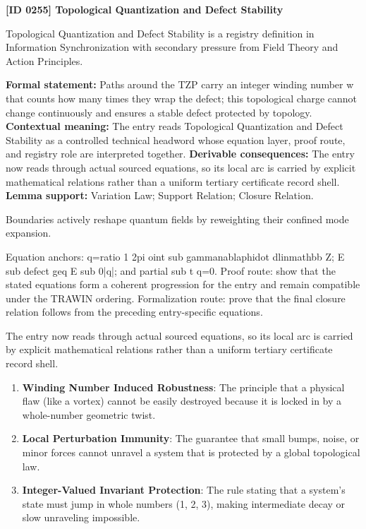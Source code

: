 \clearpage
\noindent\textbf{[ID 0255] Topological Quantization and Defect Stability}\par
\vspace{0.35em}
\begingroup\small
{}
Topological Quantization and Defect Stability is a registry definition in Information Synchronization with secondary pressure from Field Theory and Action Principles.

\begingroup\footnotesize\setlength{\emergencystretch}{3em}\sloppy
\textbf{Formal statement:} Paths around the TZP carry an integer winding number w that counts how many times they wrap the defect; this topological charge cannot change continuously and ensures a stable defect protected by topology. \textbf{Contextual meaning:} The entry reads Topological Quantization and Defect Stability as a controlled technical headword whose equation layer, proof route, and registry role are interpreted together. \textbf{Derivable consequences:} The entry now reads through actual sourced equations, so its local arc is carried by explicit mathematical relations rather than a uniform tertiary certificate record shell. \textbf{Lemma support:} Variation Law; Support Relation; Closure Relation.\par
\endgroup

Boundaries actively reshape quantum fields by reweighting their confined mode expansion.

Equation anchors: q=ratio 1 2pi oint sub gammanablaphidot dlinmathbb Z; E sub defect geq E sub 0|q|; and partial sub t q=0. Proof route: show that the stated equations form a coherent progression for the entry and remain compatible under the TRAWIN ordering. Formalization route: prove that the final closure relation follows from the preceding entry-specific equations.

The entry now reads through actual sourced equations, so its local arc is carried by explicit mathematical relations rather than a uniform tertiary certificate record shell.
\endgroup

\begin{enumerate}[leftmargin=1.6em,itemsep=6pt,topsep=4pt]
\item \textbf{Winding Number Induced Robustness}: The principle that a physical flaw (like a vortex) cannot be easily destroyed because it is locked in by a whole-number geometric twist.
\item \textbf{Local Perturbation Immunity}: The guarantee that small bumps, noise, or minor forces cannot unravel a system that is protected by a global topological law.
\item \textbf{Integer-Valued Invariant Protection}: The rule stating that a system's state must jump in whole numbers (1, 2, 3), making intermediate decay or slow unraveling impossible.
\end{enumerate}

